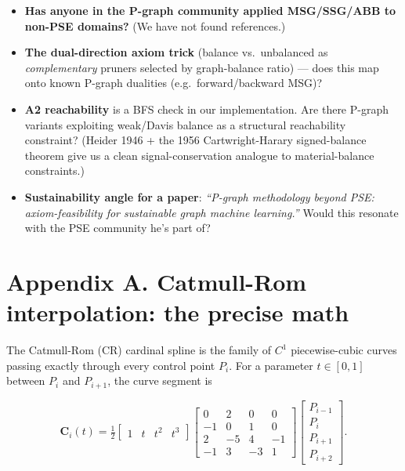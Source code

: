 \documentclass[11pt,a4paper]{article}
\begin{document}
\begin{itemize}
\item \textbf{Has anyone in the P-graph community applied
      MSG/SSG/ABB to non-PSE domains?} (We have not found
      references.)
\item \textbf{The dual-direction axiom trick} (balance vs.\
      unbalanced as \emph{complementary} pruners selected by
      graph-balance ratio) --- does this map onto known P-graph
      dualities (e.g.\ forward/backward MSG)?
\item \textbf{A2 reachability} is a BFS check in our implementation.
      Are there P-graph variants exploiting weak/Davis balance as a
      structural reachability constraint? (Heider 1946 + the 1956
      Cartwright-Harary signed-balance theorem give us a clean
      signal-conservation analogue to material-balance constraints.)
\item \textbf{Sustainability angle for a paper}: \emph{``P-graph
      methodology beyond PSE: axiom-feasibility for sustainable
      graph machine learning.''} Would this resonate with the PSE
      community he's part of?
\end{itemize}

\section*{Appendix A. Catmull-Rom interpolation: the precise math}

The Catmull-Rom (CR) cardinal spline is the family of $C^1$
piecewise-cubic curves passing exactly through every control point
$P_i$. For a parameter $t \in [0, 1]$ between $P_i$ and $P_{i+1}$,
the curve segment is

\begin{equation}
\mathbf{C}_i(t) = \tfrac{1}{2}
\begin{bmatrix} 1 & t & t^2 & t^3 \end{bmatrix}
\begin{bmatrix}
 0 &  2 &  0 &  0 \\
-1 &  0 &  1 &  0 \\
 2 & -5 &  4 & -1 \\
-1 &  3 & -3 &  1
\end{bmatrix}
\begin{bmatrix} P_{i-1} \\ P_i \\ P_{i+1} \\ P_{i+2} \end{bmatrix}.
\label{eq:cr}
\end{equation}
\end{document}
